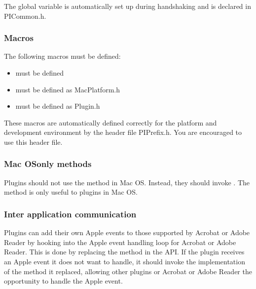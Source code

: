 \documentclass[letterpaper,12pt,english,openany,oneside]{sphinxmanual}
\begin{document}
The global variable  is automatically set up during handshaking and is declared in PICommon.h.


\subsubsection{Macros}
\label{\detokenize{Plugins_CreatingSimplePlug:macros}}
The following macros must be defined:
\begin{itemize}
\item {} 
 must be defined

\item {} 
 must be defined as MacPlatform.h

\item {} 
 must be defined as Plugin.h

\end{itemize}

These macros are automatically defined correctly for the platform and development environment by the header file PIPrefix.h. You are encouraged to use this header file.


\subsubsection{Mac OS\sphinxhyphen{}only methods}
\label{\detokenize{Plugins_CreatingSimplePlug:mac-os-only-methods}}
Plugins should not use the  method in Mac OS. Instead, they should invoke . The  method is only useful to plugins in Mac OS.


\subsubsection{Inter application communication}
\label{\detokenize{Plugins_CreatingSimplePlug:inter-application-communication}}\label{\detokenize{Plugins_CreatingSimplePlug:interapplication-communication-1}}
Plugins can add their own Apple events to those supported by Acrobat or Adobe Reader by hooking into the Apple event handling loop for Acrobat or Adobe Reader. This is done by replacing the  method in the API. If the plugin receives an Apple event it does not want to handle, it should invoke the implementation of the method it replaced, allowing other plugins or Acrobat or Adobe Reader the opportunity to handle the Apple event.
\end{document}
